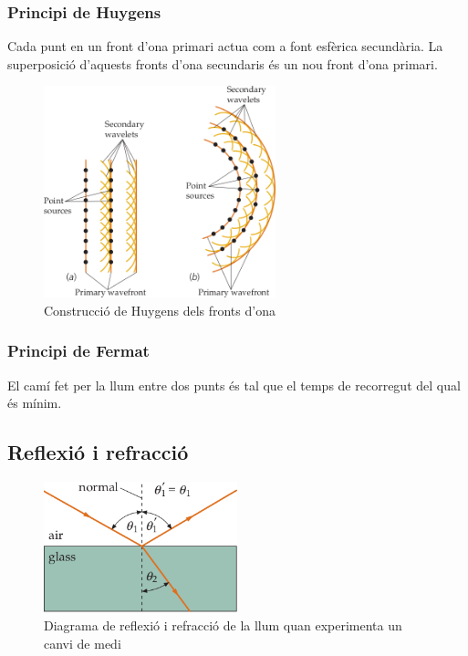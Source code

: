 \subsubsection*{Principi de Huygens}
Cada punt en un front d'ona primari actua com a font esfèrica secundària. La superposició d'aquests fronts d'ona secundaris és un nou front d'ona primari.
\begin{figure}[H]
\centering
    \includegraphics[width=0.6\textwidth]{images/3/32-huygens.png}
\caption{Construcció de Huygens dels fronts d'ona}
\end{figure}

\subsubsection*{Principi de Fermat}
 El camí fet per la llum entre dos punts és tal que el temps de recorregut del qual és mínim.

\subsection{Reflexió i refracció}
\begin{figure}[H]
\centering
    \includegraphics[width=0.5\textwidth]{images/3/33-refl-refr.png}
\caption{Diagrama de reflexió i refracció de la llum quan experimenta un canvi de medi}
\end{figure}
